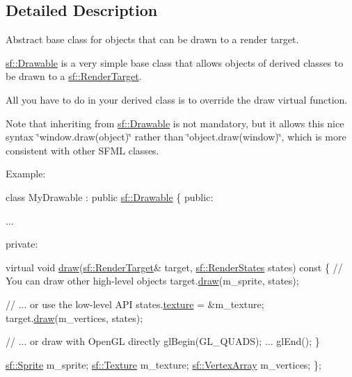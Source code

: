 \subsection{Detailed Description}
Abstract base class for objects that can be drawn to a render target. 

\hyperlink{classsf_1_1_drawable}{sf\+::\+Drawable} is a very simple base class that allows objects of derived classes to be drawn to a \hyperlink{classsf_1_1_render_target}{sf\+::\+Render\+Target}.

All you have to do in your derived class is to override the draw virtual function.

Note that inheriting from \hyperlink{classsf_1_1_drawable}{sf\+::\+Drawable} is not mandatory, but it allows this nice syntax \char`\"{}window.\+draw(object)\char`\"{} rather than \char`\"{}object.\+draw(window)\char`\"{}, which is more consistent with other S\+F\+ML classes.

Example\+: 
\begin{DoxyCode}
\textcolor{keyword}{class }MyDrawable : \textcolor{keyword}{public} \hyperlink{classsf_1_1_drawable}{sf::Drawable}
\{
\textcolor{keyword}{public}:

   ...

private:

    \textcolor{keyword}{virtual} \textcolor{keywordtype}{void} \hyperlink{classsf_1_1_drawable_a90d2c88bba9b035a0844eccb380ef631}{draw}(\hyperlink{classsf_1_1_render_target}{sf::RenderTarget}& target, 
      \hyperlink{classsf_1_1_render_states}{sf::RenderStates} states)\textcolor{keyword}{ const}
\textcolor{keyword}{    }\{
        \textcolor{comment}{// You can draw other high-level objects}
        target.\hyperlink{classsf_1_1_render_target_a12417a3bcc245c41d957b29583556f39}{draw}(m\_sprite, states);

        \textcolor{comment}{// ... or use the low-level API}
        states.\hyperlink{classsf_1_1_render_states_a457fc5a41731889de9cf39cf9b3436c3}{texture} = &m\_texture;
        target.\hyperlink{classsf_1_1_render_target_a12417a3bcc245c41d957b29583556f39}{draw}(m\_vertices, states);

        \textcolor{comment}{// ... or draw with OpenGL directly}
        glBegin(GL\_QUADS);
        ...
        glEnd();
    \}

    \hyperlink{classsf_1_1_sprite}{sf::Sprite} m\_sprite;
    \hyperlink{classsf_1_1_texture}{sf::Texture} m\_texture;
    \hyperlink{classsf_1_1_vertex_array}{sf::VertexArray} m\_vertices;
\};
\end{DoxyCode}



